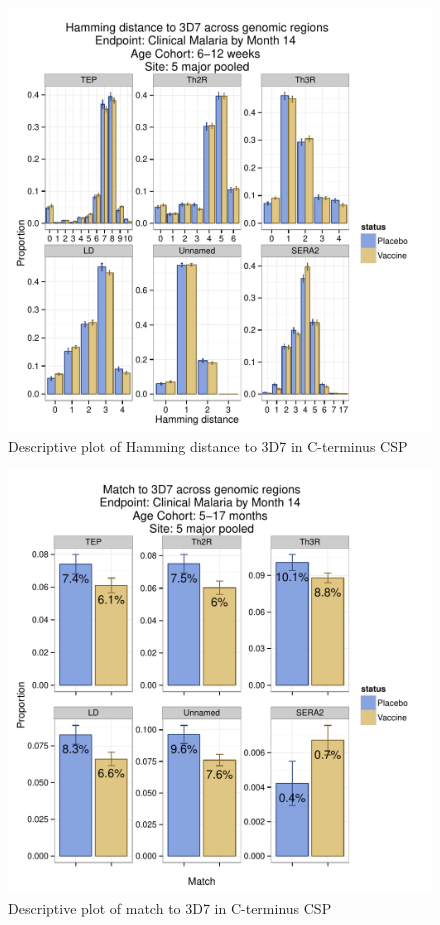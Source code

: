 \documentclass[]{article}
\begin{document}
\begin{figure}[htbp]
\centering
\includegraphics{figures/hamming-newborn-c-1.pdf}
\caption{Descriptive plot of Hamming distance to 3D7 in C-terminus CSP}
\end{figure}

\begin{figure}[htbp]
\centering
\includegraphics{figures/match-infant-c-1.pdf}
\caption{Descriptive plot of match to 3D7 in C-terminus CSP}
\end{figure}
\end{document}
